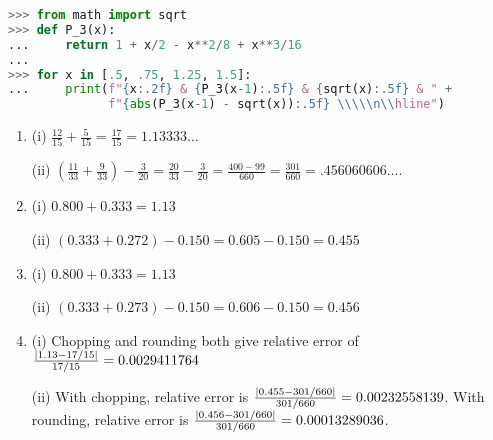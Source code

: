 \documentclass{article}
\begin{document}
\begin{lstlisting}[language=Python]
>>> from math import sqrt
>>> def P_3(x):
...     return 1 + x/2 - x**2/8 + x**3/16
... 
>>> for x in [.5, .75, 1.25, 1.5]:
...     print(f"{x:.2f} & {P_3(x-1):.5f} & {sqrt(x):.5f} & " +
              f"{abs(P_3(x-1) - sqrt(x)):.5f} \\\\\n\\hline")
\end{lstlisting}

\bigskip
\begin{prob}
\end{prob}
\begin{enumerate}[label=(\alph*)]
    \item (i) $\frac{12}{15} + \frac{5}{15} = \frac{17}{15} = 1.13333\dots$ \par (ii) $ \left( \frac{11}{33} + \frac{9}{33} \right) - \frac{3}{20} = \frac{20}{33} - \frac{3}{20} = \frac{400 - 99}{660} = \frac{301}{660} = .456060606\dots$.
    \item (i) $0.800 + 0.333 = 1.13$ \par (ii) $ (0.333 + 0.272) - 0.150 = 0.605 - 0.150 = 0.455$
    \item (i) $0.800 + 0.333 = 1.13$ \par (ii) $ (0.333 + 0.273) - 0.150 = 0.606 - 0.150 = 0.456$
    \item (i) Chopping and rounding both give relative error of $\frac{\left\lvert 1.13-17/15 \right\rvert}{17/15} = 0.0029411764$ \par (ii) With chopping, relative error is $\frac{\left\lvert 0.455-301/660 \right\rvert}{301/660} = 0.00232558139$. With rounding, relative error is $\frac{\left\lvert 0.456-301/660 \right\rvert}{301/660} = 0.00013289036$.
\end{enumerate}

\bigskip
\begin{prob}
\end{prob}
\end{document}

